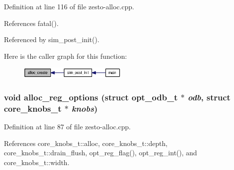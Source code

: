 Definition at line 116 of file zesto-alloc.cpp.

References fatal().

Referenced by sim\_\-post\_\-init().

Here is the caller graph for this function:\nopagebreak
\begin{figure}[H]
\begin{center}
\leavevmode
\includegraphics[width=149pt]{zesto-alloc_8h_d5e0575b7db14c11053d5da87dab1708_icgraph}
\end{center}
\end{figure}
\subsubsection[{alloc\_\-reg\_\-options}]{\setlength{\rightskip}{0pt plus 5cm}void alloc\_\-reg\_\-options (struct {\bf opt\_\-odb\_\-t} $\ast$ {\em odb}, \/  struct {\bf core\_\-knobs\_\-t} $\ast$ {\em knobs})}\label{zesto-alloc_8h_958130a4752ea3e0b57acdab47cff685}




Definition at line 87 of file zesto-alloc.cpp.

References core\_\-knobs\_\-t::alloc, core\_\-knobs\_\-t::depth, core\_\-knobs\_\-t::drain\_\-flush, opt\_\-reg\_\-flag(), opt\_\-reg\_\-int(), and core\_\-knobs\_\-t::width.